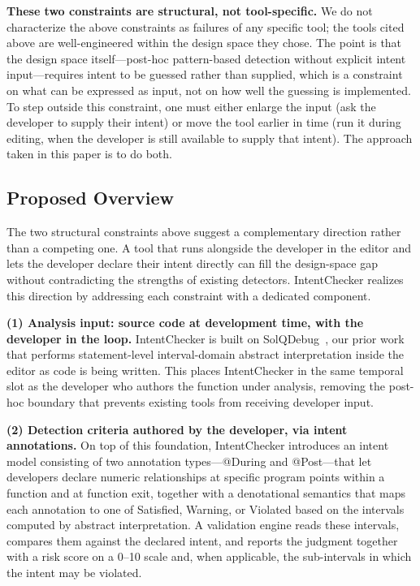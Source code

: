 \documentclass[pdflatex,sn-basic]{sn-jnl}%
\theoremstyle{thmstyleone}%
\theoremstyle{thmstyletwo}%
\theoremstyle{thmstylethree}%
\begin{document}
\smallskip
\noindent\textbf{These two constraints are structural, not tool-specific.}
We do not characterize the above constraints as failures of any specific tool; the tools cited above are well-engineered within the design space they chose.
The point is that the design space itself---post-hoc pattern-based detection without explicit intent input---requires intent to be guessed rather than supplied, which is a constraint on what can be expressed as input, not on how well the guessing is implemented.
To step outside this constraint, one must either enlarge the input (ask the developer to supply their intent) or move the tool earlier in time (run it during editing, when the developer is still available to supply that intent).
The approach taken in this paper is to do both.

\subsection{Proposed Overview}\label{sec:proposed-overview}

The two structural constraints above suggest a complementary direction rather than a competing one.
A tool that runs alongside the developer in the editor and lets the developer declare their intent directly can fill the design-space gap without contradicting the strengths of existing detectors.
IntentChecker realizes this direction by addressing each constraint with a dedicated component.

\smallskip
\noindent\textbf{(1) Analysis input: source code at development time, with the developer in the loop.}
IntentChecker is built on SolQDebug~\citep{solqdebug}, our prior work that performs statement-level interval-domain abstract interpretation inside the editor as code is being written.
This places IntentChecker in the same temporal slot as the developer who authors the function under analysis, removing the post-hoc boundary that prevents existing tools from receiving developer input.

\smallskip
\noindent\textbf{(2) Detection criteria authored by the developer, via intent annotations.}
On top of this foundation, IntentChecker introduces an intent model consisting of two annotation types---@During and @Post---that let developers declare numeric relationships at specific program points within a function and at function exit, together with a denotational semantics that maps each annotation to one of Satisfied, Warning, or Violated based on the intervals computed by abstract interpretation.
A validation engine reads these intervals, compares them against the declared intent, and reports the judgment together with a risk score on a 0--10 scale and, when applicable, the sub-intervals in which the intent may be violated.
\end{document}
